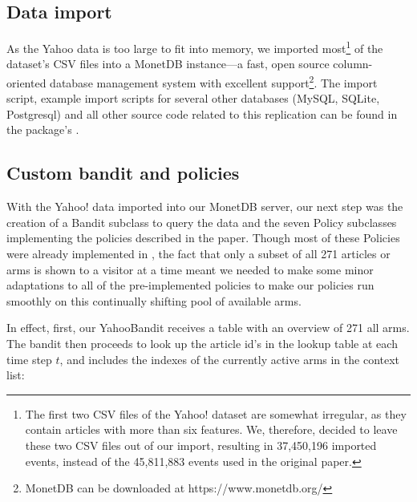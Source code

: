 \documentclass{jss}\usepackage[]{graphicx}\usepackage[]{color}
\begin{document}
\subsection{Data import}

As the Yahoo data is too large to fit into memory, we imported most\footnote{The first two CSV files of the Yahoo! dataset are somewhat irregular, as they contain articles with more than six features. We, therefore, decided to leave these two CSV files out of our import, resulting in 37,450,196 imported events, instead of the 45,811,883 events used in the original paper.} of the dataset's CSV files into a MonetDB \citep{IdreosGNMMK12} instance---a fast, open source column-oriented database management system with excellent  support\footnote{MonetDB can be downloaded at https://www.monetdb.org/}. The import script, example import scripts for several other databases (MySQL, SQLite, Postgresql) and all other source code related to this replication can be found in the package's .

\subsection{Custom bandit and policies}

With the Yahoo! data imported into our MonetDB server, our next step was the creation of a Bandit subclass to query the data and the seven Policy subclasses implementing the policies described in the \cite{Li2010} paper. Though most of these Policies were already implemented in , the fact that only a subset of all 271 articles or arms is shown to a visitor at a time meant we needed to make some minor adaptations to all of the pre-implemented policies to make our policies run smoothly on this continually shifting pool of available arms.

In effect, first, our YahooBandit receives a  table with an overview of 271 all arms. The bandit then proceeds to look up the article id's in the lookup table at each time step $t$, and includes the indexes of the currently active arms in the context list:
\end{document}
